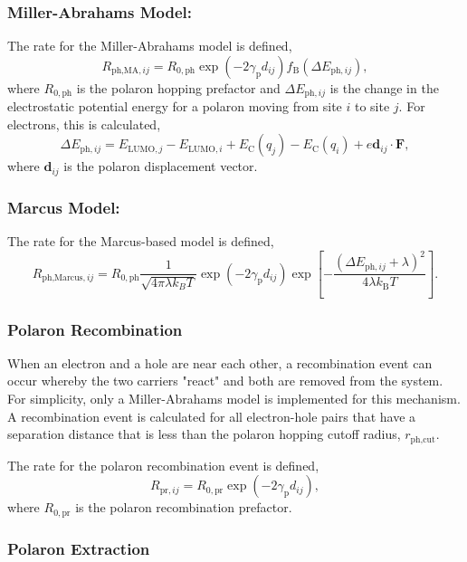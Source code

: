\documentclass[%
 reprint,onecolumn,notitlepage,
superscriptaddress,longbibliography,
 amsmath,amssymb,
 aps,rmp,floatfix,
]{revtex4-1}
\begin{document}
\subsubsection*{\textbf{Miller-Abrahams Model:}}

The rate for the Miller-Abrahams model is defined,
$$R_{\text{ph,MA},ij} = R_{0,\text{ph}} \exp{\left(- 2 \gamma_{\text{p}} d_{ij} \right)} f_\text{B} \left( \Delta E_{\text{ph},ij}\right),$$
where $R_{0,\text{ph}}$ is the polaron hopping prefactor and $\Delta E_{\text{ph},ij}$ is the change in the electrostatic potential energy for a polaron moving from site $i$ to site $j$.
For electrons, this is calculated,
$$\Delta E_{\text{ph},ij} = E_{\text{LUMO},j} - E_{\text{LUMO},i} + E_\text{C}(q_j) - E_\text{C}(q_i) + e \mathbf{d}_{ij} \cdot \mathbf{F},$$
where $\mathbf{d}_{ij}$ is the polaron displacement vector.

\subsubsection*{\textbf{Marcus Model:}}

The rate for the Marcus-based model is defined,
$$R_{\text{ph,Marcus},ij} = R_{0,\text{ph}} \frac{1}{\sqrt{4\pi\lambda k_B T}}\exp{\left(- 2 \gamma_{\text{p}} d_{ij} \right)} \exp{\left[-\frac{(\Delta E_{\text{ph},ij}+\lambda)^2}{4\lambda k_\text{B} T} \right]}.$$

\subsubsection{Polaron Recombination}

When an electron and a hole are near each other, a recombination event can occur whereby the two carriers "react" and both are removed from the system.
For simplicity, only a Miller-Abrahams model is implemented for this mechanism. 
A recombination event is calculated for all electron-hole pairs that have a separation distance that is less than the polaron hopping cutoff radius, $r_{\text{ph,cut}}$.

The rate for the polaron recombination event is defined,
$$R_{\text{pr},ij} = R_{0,\text{pr}} \exp{\left(- 2 \gamma_{\text{p}} d_{ij} \right)},$$
where $R_{0,\text{pr}}$ is the polaron recombination prefactor.

\subsubsection{Polaron Extraction}
\end{document}
